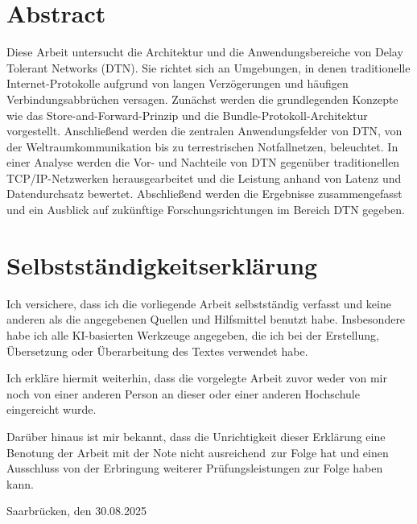 \documentclass[paper=a4,fontsize=12pt,ngerman]{scrartcl}
\begin{document}
\pagestyle{plain}



\section*{Abstract}
Diese Arbeit untersucht die Architektur und die Anwendungsbereiche von Delay Tolerant Networks (DTN).
Sie richtet sich an Umgebungen, in denen traditionelle Internet-Protokolle aufgrund von langen Verzögerungen und häufigen Verbindungsabbrüchen versagen.
Zunächst werden die grundlegenden Konzepte wie das Store-and-Forward-Prinzip und die Bundle-Protokoll-Architektur vorgestellt.
Anschließend werden die zentralen Anwendungsfelder von DTN, von der Weltraumkommunikation bis zu terrestrischen Notfallnetzen, beleuchtet.
In einer Analyse werden die Vor- und Nachteile von DTN gegenüber traditionellen TCP/IP-Netzwerken herausgearbeitet und die Leistung anhand von Latenz und Datendurchsatz bewertet.
Abschließend werden die Ergebnisse zusammengefasst und ein Ausblick auf zukünftige Forschungsrichtungen im Bereich DTN gegeben.

\newpage
\section*{Selbstständigkeitserklärung}
Ich versichere, dass ich die vorliegende Arbeit selbstständig verfasst und 
keine anderen als die angegebenen Quellen und Hilfsmittel benutzt habe.
Insbesondere habe ich alle KI-basierten Werkzeuge angegeben, die ich bei
der Erstellung, Übersetzung oder Überarbeitung des Textes verwendet habe.

Ich erkläre hiermit weiterhin, dass die vorgelegte Arbeit zuvor weder von mir 
noch von einer anderen Person an dieser oder einer anderen Hochschule 
eingereicht wurde.

Darüber hinaus ist mir bekannt, dass die Unrichtigkeit dieser Erklärung eine 
Benotung der Arbeit mit der Note \glqq nicht ausreichend\grqq \ zur Folge hat 
und einen Ausschluss von der Erbringung weiterer Prüfungsleistungen zur Folge 
haben kann.
\bigskip
 
Saarbrücken, den 30.08.2025

\smallskip





\clearpage
\tableofcontents 

\clearpage
{}
\end{document}
